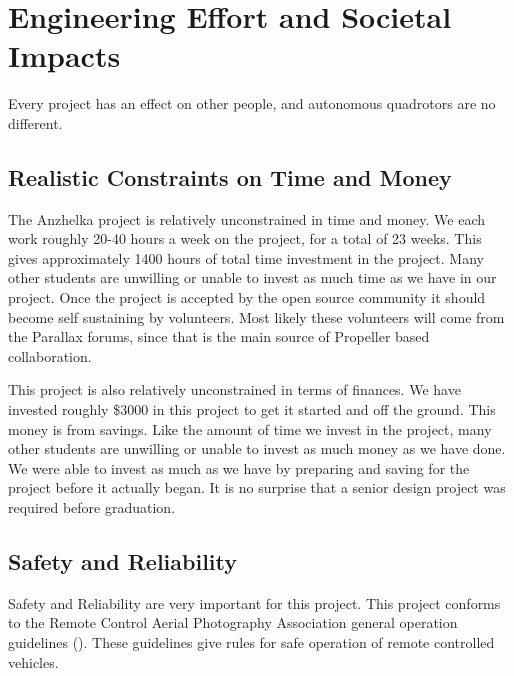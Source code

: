 \documentclass{article}
\numberwithin{equation}{section} %
\begin{document}
\section{Engineering Effort and Societal Impacts}
Every project has an effect on other people, and autonomous quadrotors are no different.

\subsection{Realistic Constraints on Time and Money}

The Anzhelka project is relatively unconstrained in time and money. We each work roughly 20-40 hours a week on the project, for a total of 23 weeks. This gives approximately 1400 hours of total time investment in the project. Many other students are unwilling or unable to invest as much time as we have in our project. Once the project is accepted by the open source community it should become self sustaining by volunteers. Most likely these volunteers will come from the Parallax forums, since that is the main source of Propeller based collaboration.

This project is also relatively unconstrained in terms of finances. We have invested roughly \$3000 in this project to get it started and off the ground. This money is from savings. Like the amount of time we invest in the project, many other students are unwilling or unable to invest as much money as we have done. We were able to invest as much as we have by preparing and saving for the project before it actually began. It is no surprise that a senior design project was required before graduation.

\subsection{Safety and Reliability}

Safety and Reliability are very important for this project. This project conforms to the Remote Control Aerial Photography Association general operation guidelines (\cite{rcapa_guidelines}). These guidelines give rules for safe operation of remote controlled vehicles. 
\end{document}
